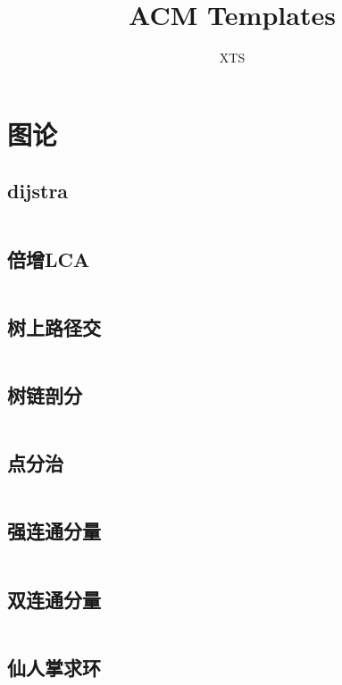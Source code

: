 \documentclass[a4paper,11pt]{article}
\author{XTS}
\title{ACM Templates}
\begin{document}
 
\maketitle 
\newpage
\tableofcontents




\newpage
\section{图论} %

\subsection{dijstra}
\inputminted[breaklines]{c++}{Graph/dijstra.cpp}

\subsection{倍增LCA}%
\inputminted[breaklines]{c++}{Graph/lca.cpp}

\subsection{树上路径交}
\inputminted[breaklines]{c++}{Graph/树上路径交.cpp}

\subsection{树链剖分}
\inputminted[breaklines]{c++}{Graph/树链剖分.cpp}

\subsection{点分治}
\inputminted[breaklines]{c++}{Graph/点分治.cpp}

\subsection{强连通分量}
\inputminted[breaklines]{c++}{Graph/scc.cpp}

\subsection{双连通分量}
\inputminted[breaklines]{c++}{Graph/bcc.cpp}

\subsection{仙人掌求环}
\inputminted[breaklines]{c++}{Graph/仙人掌求环.cpp}
\end{document}
